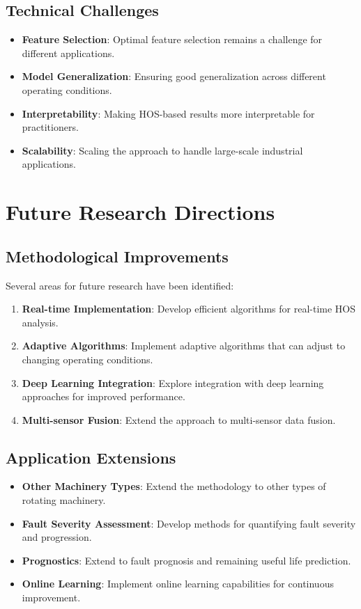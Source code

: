 \subsection{Technical Challenges}

\begin{itemize}
    \item \textbf{Feature Selection}: Optimal feature selection remains a challenge for different applications.
    \item \textbf{Model Generalization}: Ensuring good generalization across different operating conditions.
    \item \textbf{Interpretability}: Making HOS-based results more interpretable for practitioners.
    \item \textbf{Scalability}: Scaling the approach to handle large-scale industrial applications.
\end{itemize}

\section{Future Research Directions}

\subsection{Methodological Improvements}

Several areas for future research have been identified:

\begin{enumerate}
    \item \textbf{Real-time Implementation}: Develop efficient algorithms for real-time HOS analysis.
    \item \textbf{Adaptive Algorithms}: Implement adaptive algorithms that can adjust to changing operating conditions.
    \item \textbf{Deep Learning Integration}: Explore integration with deep learning approaches for improved performance.
    \item \textbf{Multi-sensor Fusion}: Extend the approach to multi-sensor data fusion.
\end{enumerate}

\subsection{Application Extensions}

\begin{itemize}
    \item \textbf{Other Machinery Types}: Extend the methodology to other types of rotating machinery.
    \item \textbf{Fault Severity Assessment}: Develop methods for quantifying fault severity and progression.
    \item \textbf{Prognostics}: Extend to fault prognosis and remaining useful life prediction.
    \item \textbf{Online Learning}: Implement online learning capabilities for continuous improvement.
\end{itemize}

